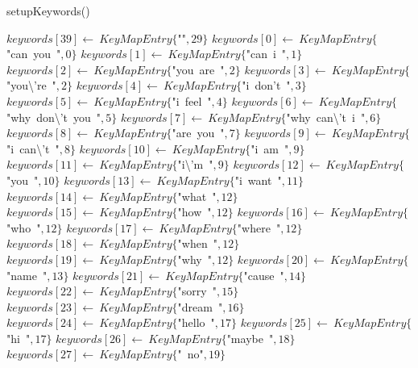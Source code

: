 \documentclass[a4paper,10pt]{article}
\begin{document}
\begin{algorithm}
\caption{setupKeywords()}
\begin{algorithmic}[5]

\STATE {}
\STATE {}
\STATE {}
  \STATE \(keywords[39]\gets\ KeyMapEntry\{\)"{}"{}\(,29\}\)
  \STATE \(keywords[0]\gets\ KeyMapEntry\{\)"{}can\ you\ "{}\(,0\}\)
  \STATE \(keywords[1]\gets\ KeyMapEntry\{\)"{}can\ i\ "{}\(,1\}\)
  \STATE \(keywords[2]\gets\ KeyMapEntry\{\)"{}you\ are\ "{}\(,2\}\)
  \STATE \(keywords[3]\gets\ KeyMapEntry\{\)"{}you\textbackslash{}'{}re\ "{}\(,2\}\)
  \STATE \(keywords[4]\gets\ KeyMapEntry\{\)"{}i\ don'{}t\ "{}\(,3\}\)
  \STATE \(keywords[5]\gets\ KeyMapEntry\{\)"{}i\ feel\ "{}\(,4\}\)
  \STATE \(keywords[6]\gets\ KeyMapEntry\{\)"{}why\ don\textbackslash{}'{}t\ you\ "{}\(,5\}\)
  \STATE \(keywords[7]\gets\ KeyMapEntry\{\)"{}why\ can\textbackslash{}'{}t\ i\ "{}\(,6\}\)
  \STATE \(keywords[8]\gets\ KeyMapEntry\{\)"{}are\ you\ "{}\(,7\}\)
  \STATE \(keywords[9]\gets\ KeyMapEntry\{\)"{}i\ can\textbackslash{}'{}t\ "{}\(,8\}\)
  \STATE \(keywords[10]\gets\ KeyMapEntry\{\)"{}i\ am\ "{}\(,9\}\)
  \STATE \(keywords[11]\gets\ KeyMapEntry\{\)"{}i\textbackslash{}'{}m\ "{}\(,9\}\)
  \STATE \(keywords[12]\gets\ KeyMapEntry\{\)"{}you\ "{}\(,10\}\)
  \STATE \(keywords[13]\gets\ KeyMapEntry\{\)"{}i\ want\ "{}\(,11\}\)
  \STATE \(keywords[14]\gets\ KeyMapEntry\{\)"{}what\ "{}\(,12\}\)
  \STATE \(keywords[15]\gets\ KeyMapEntry\{\)"{}how\ "{}\(,12\}\)
  \STATE \(keywords[16]\gets\ KeyMapEntry\{\)"{}who\ "{}\(,12\}\)
  \STATE \(keywords[17]\gets\ KeyMapEntry\{\)"{}where\ "{}\(,12\}\)
  \STATE \(keywords[18]\gets\ KeyMapEntry\{\)"{}when\ "{}\(,12\}\)
  \STATE \(keywords[19]\gets\ KeyMapEntry\{\)"{}why\ "{}\(,12\}\)
  \STATE \(keywords[20]\gets\ KeyMapEntry\{\)"{}name\ "{}\(,13\}\)
  \STATE \(keywords[21]\gets\ KeyMapEntry\{\)"{}cause\ "{}\(,14\}\)
  \STATE \(keywords[22]\gets\ KeyMapEntry\{\)"{}sorry\ "{}\(,15\}\)
  \STATE \(keywords[23]\gets\ KeyMapEntry\{\)"{}dream\ "{}\(,16\}\)
  \STATE \(keywords[24]\gets\ KeyMapEntry\{\)"{}hello\ "{}\(,17\}\)
  \STATE \(keywords[25]\gets\ KeyMapEntry\{\)"{}hi\ "{}\(,17\}\)
  \STATE \(keywords[26]\gets\ KeyMapEntry\{\)"{}maybe\ "{}\(,18\}\)
  \STATE \(keywords[27]\gets\ KeyMapEntry\{\)"{}\ no"{}\(,19\}\)

\end{algorithmic}
\end{algorithm}
\end{document}
